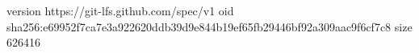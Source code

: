 version https://git-lfs.github.com/spec/v1
oid sha256:e69952f7ca7e3a922620ddb39d9e844b19ef65fb29446bf92a309aac9f6cf7c8
size 626416
